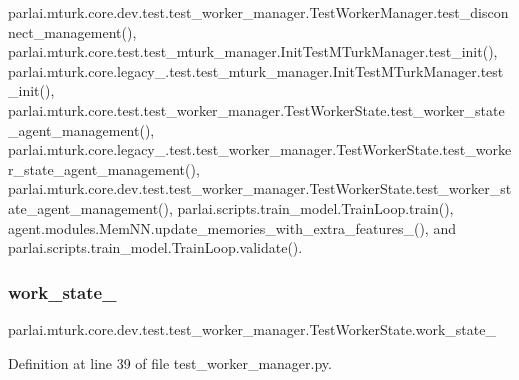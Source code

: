 parlai.\+mturk.\+core.\+dev.\+test.\+test\+\_\+worker\+\_\+manager.\+Test\+Worker\+Manager.\+test\+\_\+disconnect\+\_\+management(), parlai.\+mturk.\+core.\+test.\+test\+\_\+mturk\+\_\+manager.\+Init\+Test\+M\+Turk\+Manager.\+test\+\_\+init(), parlai.\+mturk.\+core.\+legacy\+\_.\+test.\+test\+\_\+mturk\+\_\+manager.\+Init\+Test\+M\+Turk\+Manager.\+test\+\_\+init(), parlai.\+mturk.\+core.\+test.\+test\+\_\+worker\+\_\+manager.\+Test\+Worker\+State.\+test\+\_\+worker\+\_\+state\+\_\+agent\+\_\+management(), parlai.\+mturk.\+core.\+legacy\+\_.\+test.\+test\+\_\+worker\+\_\+manager.\+Test\+Worker\+State.\+test\+\_\+worker\+\_\+state\+\_\+agent\+\_\+management(), parlai.\+mturk.\+core.\+dev.\+test.\+test\+\_\+worker\+\_\+manager.\+Test\+Worker\+State.\+test\+\_\+worker\+\_\+state\+\_\+agent\+\_\+management(), parlai.\+scripts.\+train\+\_\+model.\+Train\+Loop.\+train(), agent.\+modules.\+Mem\+N\+N.\+update\+\_\+memories\+\_\+with\+\_\+extra\+\_\+features\+\_\+(), and parlai.\+scripts.\+train\+\_\+model.\+Train\+Loop.\+validate().

\mbox{\label{classparlai_1_1mturk_1_1core_1_1dev_1_1test_1_1test__worker__manager_1_1TestWorkerState_a00cbdc83b84a36cb76e4b441bf614483}} 
\subsubsection{\texorpdfstring{work\+\_\+state\+\_}{work\_state\_1}}
{\footnotesize\ttfamily parlai.\+mturk.\+core.\+dev.\+test.\+test\+\_\+worker\+\_\+manager.\+Test\+Worker\+State.\+work\+\_\+state\+\_}



Definition at line 39 of file test\+\_\+worker\+\_\+manager.\+py.



